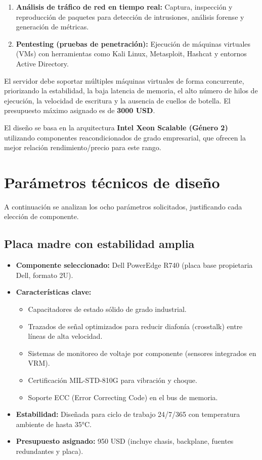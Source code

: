 \documentclass[12pt, letterpaper]{article}
\begin{document}
\begin{enumerate}
    \item \textbf{Análisis de tráfico de red en tiempo real:} Captura, inspección y reproducción de paquetes para detección de intrusiones, análisis forense y generación de métricas.
    \item \textbf{Pentesting (pruebas de penetración):} Ejecución de máquinas virtuales (VMs) con herramientas como Kali Linux, Metasploit, Hashcat y entornos Active Directory.
\end{enumerate}

El servidor debe soportar múltiples máquinas virtuales de forma concurrente, priorizando la estabilidad, la baja latencia de memoria, el alto número de hilos de ejecución, la velocidad de escritura y la ausencia de cuellos de botella. El presupuesto máximo asignado es de \textbf{3000 USD}.

El diseño se basa en la arquitectura \textbf{Intel Xeon Scalable (Género 2)} utilizando componentes reacondicionados de grado empresarial, que ofrecen la mejor relación rendimiento/precio para este rango.

\section{Parámetros técnicos de diseño}

A continuación se analizan los ocho parámetros solicitados, justificando cada elección de componente.

\subsection{Placa madre con estabilidad amplia}

\begin{itemize}
    \item \textbf{Componente seleccionado:} Dell PowerEdge R740 (placa base propietaria Dell, formato 2U).
    \item \textbf{Características clave:}
        \begin{itemize}
            \item Capacitadores de estado sólido de grado industrial.
            \item Trazados de señal optimizados para reducir diafonía (crosstalk) entre líneas de alta velocidad.
            \item Sistemas de monitoreo de voltaje por componente (sensores integrados en VRM).
            \item Certificación MIL-STD-810G para vibración y choque.
            \item Soporte ECC (Error Correcting Code) en el bus de memoria.
        \end{itemize}
    \item \textbf{Estabilidad:} Diseñada para ciclo de trabajo 24/7/365 con temperatura ambiente de hasta 35°C.
    \item \textbf{Presupuesto asignado:} 950 USD (incluye chasis, backplane, fuentes redundantes y placa).
\end{itemize}
\end{document}

